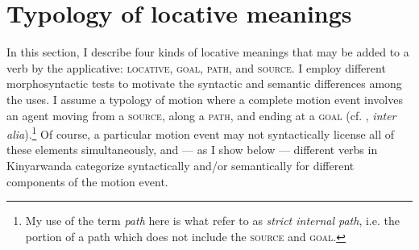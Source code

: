 \documentclass[output=paper]{langsci/langscibook}
\begin{document}
\section{Typology of locative meanings}%
\label{sec:jerro:3}
In this section, I describe four kinds of locative meanings that may be added to a verb by the applicative: {\scshape locative, goal, path}, and {\scshape source}. I employ different morphosyntactic tests to motivate the syntactic and semantic differences among the uses.  I assume a typology of motion where a complete motion event involves an agent moving from a {\scshape source}, along a {\scshape path}, and ending at a {\scshape goal} (cf. \citealt{talmy:1975,slobin:1996,zlatevy:2004,beaversetal:2009}, \emph{inter alia}).\footnote{My use of the term \emph{path} here is what \citet{ashersablay:1995} refer to as \emph{strict internal path}, i.e. the portion of a path which does not include the {\scshape source} and {\scshape goal}.} Of course, a particular motion event may not syntactically license  all of these elements simultaneously, and --- as I show below --- different verbs in Kinyarwanda categorize syntactically and/or semantically for different components of the motion event. 

\end{document}
